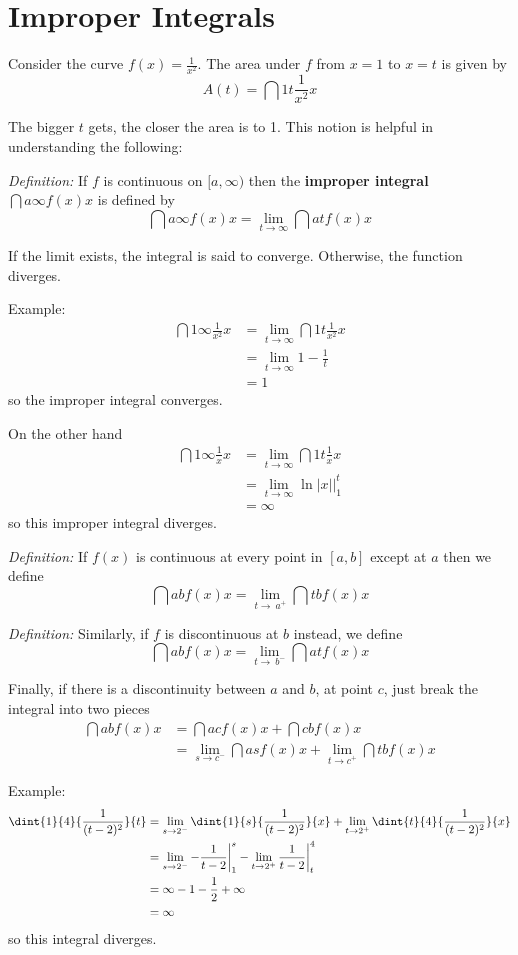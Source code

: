 \documentclass[12pt]{article}
\begin{document}
\section*{Improper Integrals}
Consider the curve $f(x) = \frac{1}{x^2}$. The area under $f$ from $x = 1$ to $x = t$ is given by \[ A(t) = \dint{1}{t}{\frac{1}{x^2}}{x} \]

The bigger $t$ gets, the closer the area is to 1. This notion is helpful in understanding the following:

\textit{Definition:} If $f$ is continuous on $[a,\infty)$ then the {\bf improper integral} $\dint{a}{\infty}{f(x)}{x}$ is defined by \[ \dint{a}{\infty}{f(x)}{x} = \lim_{t\to\infty} \dint{a}{t}{f(x)}{x} \]

If the limit exists, the integral is said to converge. Otherwise, the function diverges.

Example:
\begin{align*}
\dint{1}{\infty}{\frac{1}{x^2}}{x} &= \lim_{t\to\infty} \dint{1}{t}{\frac{1}{x^2}}{x}\\
&= \lim_{t\to\infty} 1-\frac{1}{t}\\
&= 1
\end{align*}
so the improper integral converges.

On the other hand
\begin{align*}
\dint{1}{\infty}{\frac{1}{x}}{x} &= \lim_{t\to\infty} \dint{1}{t}{\frac{1}{x}}{x}\\
&= \lim_{t\to\infty} \ln|x| \bigg|_1^t\\
&= \infty
\end{align*}
so this improper integral diverges.

\textit{Definition:} If $f(x)$ is continuous at every point in $[a,b]$ except at $a$ then we define \[ \dint{a}{b}{f(x)}{x} = \lim_{t\to\ a^+} \dint{t}{b}{f(x)}{x} \]

\textit{Definition:} Similarly, if $f$ is discontinuous at $b$ instead, we define \[ \dint{a}{b}{f(x)}{x} = \lim_{t\to\ b^-} \dint{a}{t}{f(x)}{x} \]

Finally, if there is a discontinuity between $a$ and $b$, at point $c$, just break the integral into two pieces
\begin{align*}
\dint{a}{b}{f(x)}{x} &= \dint{a}{c}{f(x)}{x} + \dint{c}{b}{f(x)}{x}\\
&= \lim_{s\to c^-} \dint{a}{s}{f(x)}{x} + \lim_{t\to c^+} \dint{t}{b}{f(x)}{x}
\end{align*}

Example:
\begin{align*}
\dint{1}{4}{\frac{1}{(t-2)^2}}{t} &= \lim_{s\to 2^-} \dint{1}{s}{\frac{1}{(t-2)^2}}{x} + \lim_{t\to 2^+} \dint{t}{4}{\frac{1}{(t-2)^2}}{x}\\
&= \lim_{s\to 2^-} -\frac{1}{t-2} \bigg|_1^s - \lim_{t\to 2^+} \frac{1}{t-2} \bigg|_t^4\\
&= \infty - 1 - \half + \infty\\
&= \infty
\end{align*}
so this integral diverges.
\end{document}
